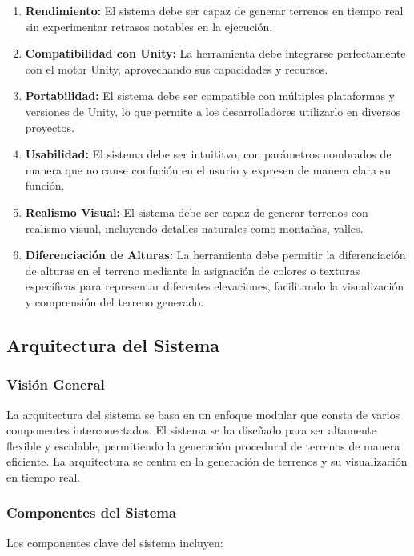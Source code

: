 \begin{enumerate}
    \item \textbf{Rendimiento:} El sistema debe ser capaz de generar terrenos en tiempo real sin experimentar retrasos notables en la ejecución.
    
    \item \textbf{Compatibilidad con Unity:} La herramienta debe integrarse perfectamente con el motor Unity, aprovechando sus capacidades y recursos.
    
    \item \textbf{Portabilidad:} El sistema debe ser compatible con múltiples plataformas y versiones de Unity, lo que permite a los desarrolladores utilizarlo en diversos proyectos.
    
    \item \textbf{Usabilidad:} El sistema debe ser intuititvo, con parámetros nombrados de manera que no cause confución en el usurio y expresen de manera clara su función.
    
    \item \textbf{Realismo Visual:} El sistema debe ser capaz de generar terrenos con realismo visual, incluyendo detalles naturales como montañas, valles.
    
    \item \textbf{Diferenciación de Alturas:} La herramienta debe permitir la diferenciación de alturas en el terreno mediante la asignación de colores o texturas específicas para representar diferentes elevaciones, facilitando la visualización y comprensión del terreno generado.

\end{enumerate}

\subsection{Arquitectura del Sistema}

\subsubsection{Visión General}
La arquitectura del sistema se basa en un enfoque modular que consta de varios componentes interconectados. El sistema se ha diseñado para ser altamente flexible y escalable, permitiendo la generación procedural de terrenos de manera eficiente. La arquitectura se centra en la generación de terrenos y su visualización en tiempo real.

\subsubsection{Componentes del Sistema}
Los componentes clave del sistema incluyen:

